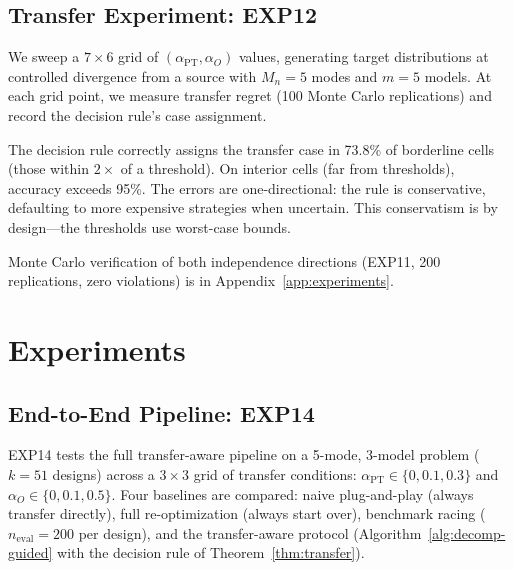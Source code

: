 \documentclass[11pt]{article}
\newcommand{\Mn}{M_n}
\begin{document}
\subsection{Transfer Experiment: EXP12}
\label{sec:exp12}

We sweep a $7 \times 6$ grid of
$(\alpha_{\mathrm{PT}}, \alpha_O)$ values,
generating target distributions at controlled divergence from a source
with $\Mn{=}5$ modes and $m{=}5$ models.  At each grid point, we measure
transfer regret (100 Monte Carlo replications) and record the decision
rule's case assignment.

The decision rule correctly assigns the transfer case in 73.8\% of
borderline cells (those within $2\times$ of a threshold).
On interior cells (far from thresholds), accuracy exceeds 95\%.
The errors are one-directional: the rule is conservative, defaulting to
more expensive strategies when uncertain.  This conservatism is by
design---the thresholds use worst-case bounds.

Monte Carlo verification of both independence directions (EXP11, 200 replications, zero violations) is in Appendix~\ref{app:experiments}.



\section{Experiments}
\label{sec:experiments}

\subsection{End-to-End Pipeline: EXP14}
\label{sec:exp14}

EXP14 tests the full transfer-aware pipeline on a 5-mode, 3-model
problem ($k{=}51$ designs) across a $3 \times 3$ grid of transfer
conditions: $\alpha_{\mathrm{PT}} \in \{0, 0.1, 0.3\}$ and
$\alpha_O \in \{0, 0.1, 0.5\}$.  Four baselines are compared:
naive plug-and-play (always transfer directly), full re-optimization
(always start over), benchmark racing ($n_{\mathrm{eval}}{=}200$ per
design), and the transfer-aware protocol (Algorithm~\ref{alg:decomp-guided}
with the decision rule of Theorem~\ref{thm:transfer}).
\end{document}
